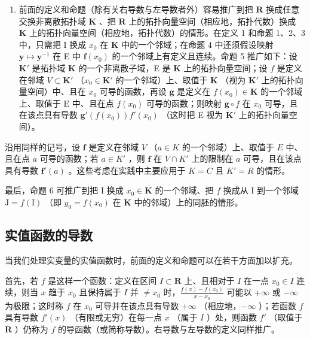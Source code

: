 \begin{enumerate}
\def\labelenumi{\arabic{enumi})}
\setcounter{enumi}{1}
\tightlist
\item
  前面的定义和命题（除有关右导数与左导数者外）容易推广到把 \(\mathbf{R}\) 换成任意交换非离散拓扑域 \(\mathbf{K}\) 、把 \(\mathbf{R}\) 上的拓扑向量空间（相应地，拓扑代数）换成 \(\mathbf{K}\) 上的拓扑向量空间（相应地，拓扑代数）的情形。在定义 1 和命题 1、2、3 中，只需把 I 换成 \(x_0\) 在 \(\mathbf{K}\) 中的一个邻域；在命题 4 中还须假设映射 \(\mathbf{y} \mapsto \mathbf{y}^{-1}\) 在 E 中 \(\mathbf{f}(x_0)\) 的一个邻域上有定义且连续。命题 5 推广如下：设 \(\mathbf{K}'\) 是拓扑域 \(\mathbf{K}\) 的一个非离散子域，E 是 \(\mathbf{K}\) 上的拓扑向量空间；设 \(f\) 是定义在邻域 \(V \subset \mathbf{K}'\) （\(x_0 \in \mathbf{K}'\) 的一个邻域）上、取值于 \(\mathbf{K}\) （视为 \(\mathbf{K}'\) 上的拓扑向量空间）中、且在 \(x_0\) 可导的函数，再设 \(\mathbf{g}\) 是定义在 \(f(x_0) \in \mathbf{K}\) 的一个邻域上、取值于 E 中、且在点 \(f(x_0)\) 可导的函数；则映射 \(\mathbf{g} \circ f\) 在 \(x_0\) 可导，且在该点具有导数 \(\mathbf{g}'(f(x_0))f'(x_0)\) （这时把 E 视为 \(\mathbf{K}'\) 上的拓扑向量空间）。
\end{enumerate}

沿用同样的记号，设 \(\mathbf{f}\) 是定义在邻域 \(V\) （\(a \in K\) 的一个邻域）上、取值于 \(E\) 中、且在点 \(a\) 可导的函数；若 \(a \in K'\) ，则 \(\mathbf{f}\) 在 \(V \cap K'\) 上的限制在 \(a\) 可导，且在该点具有导数 \(\mathbf{f}'(a)\) 。这些考虑在实践中主要应用于 \(K = C\) 且 \(K' = R\) 的情形。

最后，命题 6 可推广到把 I 换成 \(x_0 \in \mathbf{K}\) 的一个邻域、把 \(f\) 换成从 I 到一个邻域 \(\mathrm{J} = f(\mathrm{I})\) （即 \(y_0 = f(x_0)\) 在 \(\mathbf{K}\) 中的邻域）上的同胚的情形。

\subsection{实值函数的导数}

当我们处理实变量的实值函数时，前面的定义和命题可以在若干方面加以扩充。

首先，若 \(f\) 是这样一个函数：定义在区间 \(I \subset \mathbf{R}\) 上、且相对于 \(I\) 在一点 \(x_0 \in I\) 连续，则当 \(x\) 趋于 \(x_0\) 且保持属于 \(I\) 并 \(\neq x_0\) 时，\(\frac{f(x) - f(x_0)}{x - x_0}\) 可能以 \(+\infty\) 或 \(-\infty\) 为极限；这时称 \(f\) 在 \(x_0\) 可导并在该点具有导数 \(+\infty\) （相应地，\(-\infty\) ）；若函数 \(f\) 具有导数 \(f'(x)\) （有限或无穷）在每一点 \(x\) （属于 \(I\) ）处，则函数 \(f'\) （取值于 \(\overline{\mathbf{R}}\) ）仍称为 \(f\) 的导函数（或简称导数）。右导数与左导数的定义同样推广。

